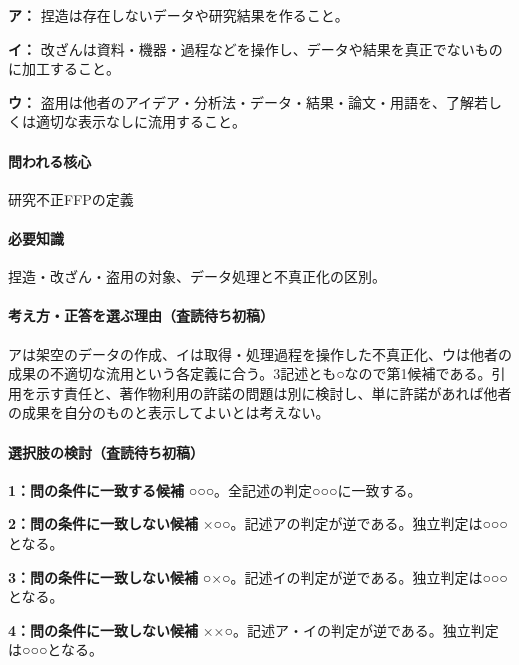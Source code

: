 \noindent\textbf{ア：} 捏造は存在しないデータや研究結果を作ること。\par

\noindent\textbf{イ：} 改ざんは資料・機器・過程などを操作し、データや結果を真正でないものに加工すること。\par

\noindent\textbf{ウ：} 盗用は他者のアイデア・分析法・データ・結果・論文・用語を、了解若しくは適切な表示なしに流用すること。\par

\paragraph{問われる核心} 研究不正FFPの定義

\paragraph{必要知識} 捏造・改ざん・盗用の対象、データ処理と不真正化の区別。

\paragraph{考え方・正答を選ぶ理由（査読待ち初稿）} アは架空のデータの作成、イは取得・処理過程を操作した不真正化、ウは他者の成果の不適切な流用という各定義に合う。3記述とも○なので第1候補である。引用を示す責任と、著作物利用の許諾の問題は別に検討し、単に許諾があれば他者の成果を自分のものと表示してよいとは考えない。

\paragraph{選択肢の検討（査読待ち初稿）}\mbox{}\par

\noindent\textbf{1：問の条件に一致する候補} ○○○。全記述の判定○○○に一致する。\par

\noindent\textbf{2：問の条件に一致しない候補} ×○○。記述アの判定が逆である。独立判定は○○○となる。\par

\noindent\textbf{3：問の条件に一致しない候補} ○×○。記述イの判定が逆である。独立判定は○○○となる。\par

\noindent\textbf{4：問の条件に一致しない候補} ××○。記述ア・イの判定が逆である。独立判定は○○○となる。\par

